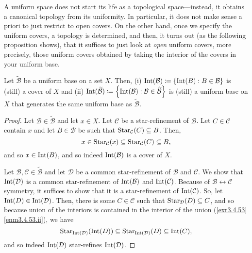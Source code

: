 A uniform space does not start its life as a topological space---instead, it obtains a canonical topology from its uniformity.  In particular, it does not make sense a priori to just restrict to open covers.  On the other hand, once we specify the uniform covers, a topology is determined, and then, it turns out (as the following proposition shows), that it suffices to just look at \emph{open} uniform covers, more precisely, those uniform covers obtained by taking the interior of the covers in your uniform base.
\begin{prp}\label{lma5.1.16}
Let $\widetilde{\mathcal{B}}$ be a uniform base on a set $X$.  Then, (i) $\operatorname{Int} (\mathcal{B})\coloneqq \{ \operatorname{Int} (B):B\in \mathcal{B}\}$ is (still) a cover of $X$ and (ii) $\operatorname{Int} (\widetilde{\mathcal{B}})\coloneqq \left\{ \operatorname{Int} (\mathcal{B}):\mathcal{B}\in \widetilde{\mathcal{B}}\right\}$ is (still) a uniform base on $X$ that generates the same uniform base as $\widetilde{\mathcal{B}}$.
\begin{proof}
Let $\mathcal{B}\in \widetilde{\mathcal{B}}$ and let $x\in X$.  Let $\mathcal{C}$ be a star-refinement of $\mathcal{B}$.  Let $C\in \mathcal{C}$ contain $x$ and let $B\in \mathcal{B}$ be such that $\operatorname{Star} _{\mathcal{C}}(C)\subseteq B$.  Then,
\begin{equation}
x\in \operatorname{Star} _{\mathcal{C}}(x)\subseteq \operatorname{Star} _{\mathcal{C}}(C)\subseteq B,
\end{equation}
and so $x\in \operatorname{Int} (B)$, and so indeed $\operatorname{Int} (\mathcal{B})$ is a cover of $X$.

Let $\mathcal{B},\mathcal{C}\in \widetilde{\mathcal{B}}$ and let $\mathcal{D}$ be a common star-refinement of $\mathcal{B}$ and $\mathcal{C}$.  We show that $\operatorname{Int} (\mathcal{D})$ is a common star-refinement of $\operatorname{Int} (\mathcal{B})$ and $\operatorname{Int} (\mathcal{C})$.  Because of $\mathcal{B}\leftrightarrow \mathcal{C}$ symmetry, it suffices to show that it is a star-refinement of $\operatorname{Int} (\mathcal{C})$.  So, let $\operatorname{Int} (D)\in \operatorname{Int} (\mathcal{D})$.  Then, there is some $C\in \mathcal{C}$ such that $\operatorname{Star} _{\mathcal{D}}(D)\subseteq C$, and so because union of the interiors is contained in the interior of the union (\cref{exr3.4.53}\ref{enm3.4.53.ii}), we have
\begin{equation}
\operatorname{Star} _{\operatorname{Int} (\mathcal{D})}(\operatorname{Int} (D))\subseteq \operatorname{Star} _{\operatorname{Int} (\mathcal{D})}(D)\subseteq \operatorname{Int} (C),
\end{equation}
and so indeed $\operatorname{Int} (\mathcal{D})$ star-refines $\operatorname{Int} (\mathcal{D})$.


\end{proof}
\end{prp}
